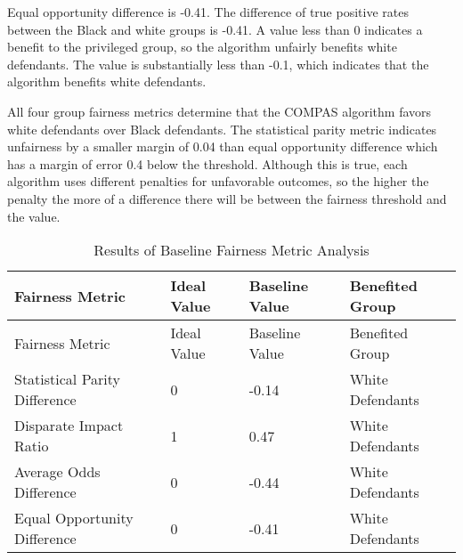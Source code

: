 \documentclass[water,article,submit,moreauthors,pdftex]{mdpi}
\begin{document}
Equal opportunity difference is -0.41. The difference of true positive
rates between the Black and white groups is -0.41. A value less than 0
indicates a benefit to the privileged group, so the algorithm unfairly
benefits white defendants. The value is substantially less than -0.1,
which indicates that the algorithm benefits white defendants.

All four group fairness metrics determine that the COMPAS algorithm
favors white defendants over Black defendants. The statistical parity
metric indicates unfairness by a smaller margin of 0.04 than equal
opportunity difference which has a margin of error 0.4 below the
threshold. Although this is true, each algorithm uses different
penalties for unfavorable outcomes, so the higher the penalty the more
of a difference there will be between the fairness threshold and the
value.

\begin{longtable}[]{@{}llll@{}}
\caption{Results of Baseline Fairness Metric Analysis
\label{tab:baseline metrics table}}\tabularnewline
\toprule
Fairness Metric & Ideal Value & Baseline Value & Benefited Group \\
\midrule
\endfirsthead
\toprule
Fairness Metric & Ideal Value & Baseline Value & Benefited Group \\
\midrule
\endhead
Statistical Parity Difference & 0 & -0.14 & White Defendants \\
Disparate Impact Ratio & 1 & 0.47 & White Defendants \\
Average Odds Difference & 0 & -0.44 & White Defendants \\
Equal Opportunity Difference & 0 & -0.41 & White Defendants \\
\bottomrule
\end{longtable}

%

\vspace{6pt}


\end{document}
